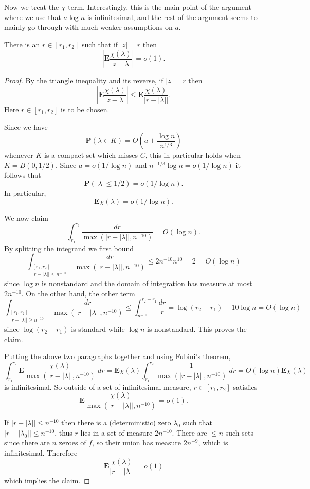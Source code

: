 \documentclass[12pt]{article}
\begin{document}
Now we treat the $\chi$ term. Interestingly, this is the main point of the argument where we use that $a \log n$ is infinitesimal, and the rest of the argument seems to mainly go through with much weaker assumptions on $a$.
\begin{lemma}
There is an $r \in [r_1, r_2]$ such that if $|z| = r$ then
$$\left|\mathbf E \frac{\chi(\lambda)}{z - \lambda}\right| = o(1).$$
\end{lemma}
\begin{proof}
By the triangle inequality and its reverse, if $|z| = r$ then
$$\left|\mathbf E \frac{\chi(\lambda)}{z - \lambda}\right| \leq \mathbf E \frac{\chi(\lambda)}{|r - |\lambda||}.$$
Here $r \in [r_1, r_2]$ is to be chosen.

Since we have
$$\mathbf P(\lambda \in K) = O\left(a + \frac{\log n}{n^{1/3}}\right)$$
whenever $K$ is a compact set which misses $C$, this in particular holds when $K = \overline{B(0, 1/2)}$.
Since $a = o(1/\log n)$ and $n^{-1/3}\log n = o(1/\log n)$ it follows that
$$\mathbf P(|\lambda| \leq 1/2) = o(1/\log n).$$
In particular,
$$\mathbf E\chi(\lambda) = o(1/\log n).$$

We now claim
$$\int_{r_1}^{r_2} \frac{dr}{\max(|r - |\lambda||, n^{-10})} = O(\log n).$$
By splitting the integrand we first bound
$$\int_{\substack{[r_1,r_2]\\|r-|\lambda|| \leq n^{-10}}} \frac{dr}{\max(|r - |\lambda||, n^{-10})} \leq 2n^{-10}n^{10} = 2 = O(\log n)$$
since $\log n$ is nonstandard and the domain of integration has measure at most $2n^{-10}$.
On the other hand, the other term
$$\int_{\substack{[r_1,r_2]\\|r-|\lambda|| \geq n^{-10}}} \frac{dr}{\max(|r - |\lambda||, n^{-10})} \leq \int_{n^{-10}}^{r_2 - r_1} \frac{dr}{r} = \log(r_2 - r_1) - 10 \log n = O(\log n)$$
since $\log(r_2 - r_1)$ is standard while $\log n$ is nonstandard.
This proves the claim.

Putting the above two paragraphs together and using Fubini's theorem,
$$\int_{r_1}^{r_2} \mathbf E \frac{\chi(\lambda)}{\max(|r - |\lambda||, n^{-10})} ~dr = \mathbf E\chi(\lambda) \int_{r_1}^{r_2} \frac{1}{\max(|r - |\lambda||, n^{-10})} ~dr = O(\log n) \mathbf E\chi(\lambda)$$
is infinitesimal.
So outside of a set of infinitesimal measure, $r \in [r_1, r_2]$ satisfies
$$\mathbf E \frac{\chi(\lambda)}{\max(|r - |\lambda||, n^{-10})} = o(1).$$

If $|r - |\lambda|| \leq n^{-10}$ then there is a (deterministic) zero $\lambda_0$ such that $|r - |\lambda_0|| \leq n^{-10}$, thus $r$ lies in a set of measure $2n^{-10}$. There are $\leq n$ such sets since there are $n$ zeroes of $f$, so their union has measure $2n^{-9}$, which is infinitesimal.
Therefore
$$\mathbf E \frac{\chi(\lambda)}{|r - |\lambda||} = o(1)$$
which implies the claim.
\end{proof}
\end{document}

